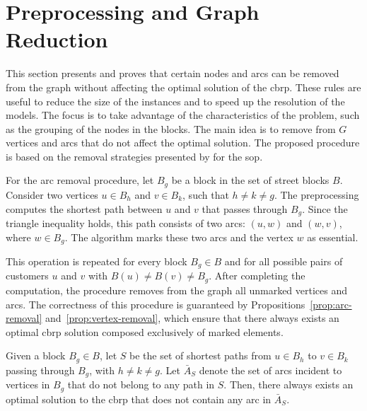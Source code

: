 
\section{Preprocessing and Graph Reduction}\label{sec:preprocessing}

This section presents and proves that certain nodes and arcs can be removed from the graph without affecting the optimal solution of the \gls{cbrp}. These rules are useful to reduce the size of the instances and to speed up the resolution of the models. The focus is to take advantage of the characteristics of the problem, such as the grouping of the nodes in the blocks. The main idea is to remove from $G$ vertices and arcs that do not affect the optimal solution. The proposed procedure is based on the removal strategies presented by
\cite{carrabs2021biased} for the \gls{sop}.

For the arc removal procedure, let $B_g$ be a block in the set of street blocks $B$.
Consider two vertices $u \in B_h$ and $v \in B_k$, such that $h \neq k \neq g$.
The preprocessing computes the shortest path between $u$ and $v$ that passes through $B_g$.
Since the triangle inequality holds, this path consists of two arcs: $(u, w)$ and $(w, v)$, where $w \in B_g$.
The algorithm marks these two arcs and the vertex $w$ as essential.

This operation is repeated for every block $B_g \in B$ and for all possible pairs of customers $u$ and $v$ with $B(u) \neq B(v) \neq B_g$.
After completing the computation, the procedure removes from the graph all unmarked vertices and arcs.
The correctness of this procedure is guaranteed by Propositions~\ref{prop:arc-removal} and~\ref{prop:vertex-removal}, which ensure that there always exists an optimal \gls{cbrp} solution composed exclusively of marked elements.

\begin{proposition}
	\label{prop:arc-removal}
	Given a block $B_g \in B$, let $S$ be the set of shortest paths from $u \in B_h$ to $v \in B_k$ passing through $B_g$, with $h \neq k \neq g$.
	Let $\bar{A}_S$ denote the set of arcs incident to vertices in $B_g$ that do not belong to any path in $S$.
	Then, there always exists an optimal solution to the \gls{cbrp} that does not contain any arc in $\bar{A}_S$.
\end{proposition}

